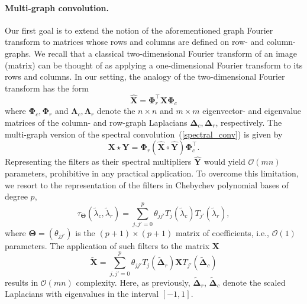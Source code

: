 \documentclass{article}
\begin{document}
\paragraph*{Multi-graph convolution. }
Our first goal is to extend the notion of the aforementioned graph Fourier transform to matrices whose rows and columns are defined on row- and column-graphs. We recall that a classical two-dimensional Fourier transform of an image (matrix) can be thought of as applying a one-dimensional Fourier transform to its rows and columns. 
In our setting, the analogy of the two-dimensional Fourier transform has the form
\begin{equation}
\hat{\mathbf{X}} = \boldsymbol{\Phi}_r^\top \mathbf{X} \boldsymbol{\Phi}_c
\end{equation}
where $\boldsymbol{\Phi}_c, \boldsymbol{\Phi}_r$ and $\boldsymbol{\Lambda}_c, \boldsymbol{\Lambda}_r$  denote the $n\times n$ and $m\times m$ eigenvector- and eigenvalue matrices of the column- and row-graph Laplacians $\boldsymbol{\Delta}_c, \boldsymbol{\Delta}_r$, respectively. 
The multi-graph version of the spectral convolution~(\ref{spectral_conv}) is given by 
\begin{equation}
\mathbf{X} \star \mathbf{Y} =   \boldsymbol{\Phi}_r (\hat{\mathbf{X}} \circ \hat{\mathbf{Y}}) \boldsymbol{\Phi}_c^\top. 
\end{equation}
Representing the filters as their spectral multipliers $\hat{\mathbf{Y}}$ would yield $\mathcal{O}(mn)$ parameters, prohibitive in any practical application. 
To overcome this limitation, we resort to the representation of the filters in Chebychev polynomial bases of degree $p$, 
\begin{equation}
	\tau_{\boldsymbol{\Theta}}(\tilde{\lambda}_c, \tilde{\lambda}_r) = \sum_{j,j'=0}^{p} \theta_{jj'} T_j(\tilde{\lambda}_c) T_{j'}(\tilde{\lambda}_r),
\end{equation}
where $\boldsymbol{\Theta} = (\theta_{jj'})$ is the $(p+1)\times(p+1)$ matrix of coefficients, i.e., $\mathcal{O}(1)$ parameters.  
The application of such filters to the matrix $\mathbf{X}$ 
\begin{equation}
\tilde{\mathbf{X}} = \sum_{j,j' = 0}^p \theta_{jj'} T_{j}(\tilde{\boldsymbol{\Delta}}_r) \mathbf{X} T_{j'}(\tilde{\boldsymbol{\Delta}}_c) 
\label{eq:cheb-approx}
\end{equation}
results in $\mathcal{O}(mn)$ complexity. Here, as previously, $\tilde{\boldsymbol{\Delta}}_r$, $\tilde{\boldsymbol{\Delta}}_c$ denote the scaled Laplacians with eigenvalues in the interval $[-1,1]$. 
\end{document}
